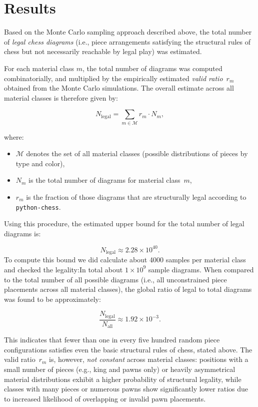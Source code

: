 \documentclass[12pt]{article}
\begin{document}
\section{Results}

Based on the Monte Carlo sampling approach described above, the total number of \emph{legal chess diagrams} (i.e., piece arrangements satisfying the structural rules of chess but not necessarily reachable by legal play) was estimated.

For each material class $m$, the total number of diagrams was computed combinatorially, and multiplied by the empirically estimated \emph{valid ratio}~$r_m$ obtained from the Monte Carlo simulations.  
The overall estimate across all material classes is therefore given by:

\[
N_{\text{legal}} = \sum_{m \in \mathcal{M}} r_m \cdot N_m,
\]

where:
\begin{itemize}
    \item $\mathcal{M}$ denotes the set of all material classes (possible distributions of pieces by type and color),
    \item $N_m$ is the total number of diagrams for material class~$m$,
    \item $r_m$ is the fraction of those diagrams that are structurally legal according to \texttt{python-chess}.
\end{itemize}

Using this procedure, the estimated upper bound for the total number of legal diagrams is:

\[
N_{\text{legal}} \approx 2.28 \times 10^{40}.
\]
To compute this bound we did calculate about 4000 samples per material class and checked the legality:In total about $1\times 10^{9}$ sample diagrams.
\noindent
When compared to the total number of all possible diagrams (i.e., all unconstrained piece placements across all material classes), the global ratio of legal to total diagrams was found to be approximately:

\[
\frac{N_{\text{legal}}}{N_{\text{all}}} \approx 1.92 \times 10^{-3}.
\]

This indicates that fewer than one in every five hundred random piece configurations satisfies even the basic structural rules of chess, stated above.
The valid ratio~$r_m$ is, however, \emph{not constant} across material classes: positions with a small number of pieces (e.g., king and pawns only) or heavily asymmetrical material distributions exhibit a higher probability of structural legality, while classes with many pieces or numerous pawns show significantly lower ratios due to increased likelihood of overlapping or invalid pawn placements.
\end{document}

